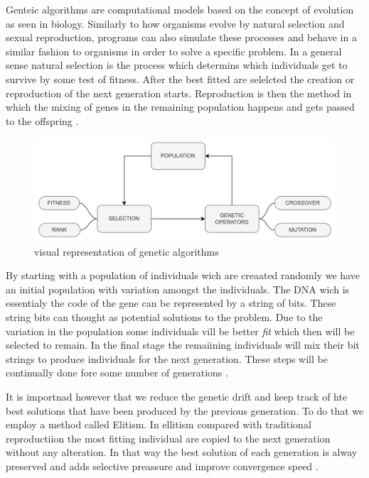 Genteic algorithms are computational models based on the concept of evolution as seen in biology. Similarly to how organisms evolve by natural selection and sexual reproduction, programs can also simulate these processes and behave in a similar fashion to organisms in order to solve a specific problem. In a general sense natural selection is the process which determins which individuals get to survive by some test of fitness. After the best fitted are selelcted the creation or reproduction of the next generation starts. Reproduction is then the method in which the mixing of genes in the remaining population happens and gets passed to the offspring \cite{holland1992genetic}.
\begin{figure}[H]
    \centering
    \includegraphics [scale = 0.08]{Images/GA_graph.png}
    \caption{visual representation of genetic algorithms}
    \label{figGA}
\end{figure}

By starting with a population of individuals wich are creaated randomly we have an initial population with variation amongst the individuals. The DNA wich is essentialy the code of the gene can be represented by a string of bits. These string bits can thought as potential solutions to the problem. Due to the variation in the population some individuals vill be better \textit{fit} which then will be selected to remain. In the final stage the remaiining individuals will mix their bit strings to produce individuals for the next generation. These steps will be continually done fore some number of generations \cite{forrest1996genetic}. 

It is importnad however that we reduce the genetic drift and keep track of hte best solutions that have been produced by the previous generation. To do that we employ a method called Elitism. In ellitism compared with traditional reproductiion the most fitting individual are copied to the next generation without any alteration. In that way the best solution of each generation is alway preserved and adds selective preassure and improve convergence speed \cite{du2018elitism}.

